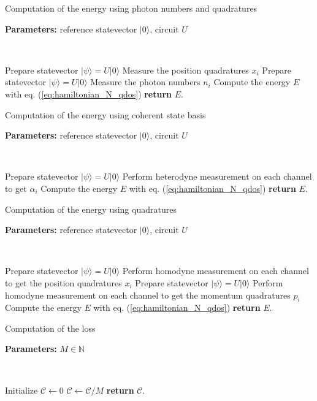 \documentclass[reprint, amsmath, amssymb, aps]{revtex4-2}
\begin{document}
    \begin{algorithm}
        \caption{Computation of the energy using photon numbers and quadratures}\label{alg:energy_computation}
            \textbf{Parameters:} reference statevector $|0\rangle$, circuit $U$

            \

            Prepare statevector $|\psi\rangle = U|0\rangle$\;
            Measure the position quadratures $x_i$\;
            Prepare statevector $|\psi\rangle = U|0\rangle$\;
            Measure the photon numbers $n_i$\;
            Compute the energy $E$ with eq. (\ref{eq:hamiltonian_N_qdos})\;
            \textbf{return} $E$.
    \end{algorithm}

    \begin{algorithm}
        \caption{Computation of the energy using coherent state basis}\label{alg:energy_computation_coherent_basis}
            \textbf{Parameters:} reference statevector $|0\rangle$, circuit $U$

            \

            Prepare statevector $|\psi\rangle = U|0\rangle$\;
            Perform heterodyne measurement on each channel to get $\alpha_i$\;
            Compute the energy $E$ with eq. (\ref{eq:hamiltonian_N_qdos})\;
            \textbf{return} $E$.
    \end{algorithm}

    \begin{algorithm}
        \caption{Computation of the energy using quadratures}
        \label{alg:energy_computation_quadratures}
            \textbf{Parameters:} reference statevector $|0\rangle$, circuit $U$

            \

            Prepare statevector $|\psi\rangle = U|0\rangle$\;
            Perform homodyne measurement on each channel to get the position quadratures $x_i$\;
            Prepare statevector $|\psi\rangle = U|0\rangle$\;
            Perform homodyne measurement on each channel to get the momentum quadratures $p_i$\;
            Compute the energy $E$ with eq. (\ref{eq:hamiltonian_N_qdos})\;
            \textbf{return} $E$.
    \end{algorithm}

    \begin{algorithm}
        \caption{Computation of the loss}\label{alg:loss_computation}
            \textbf{Parameters:} $M\in\mathbb N$

            \

            Initialize $\mathcal C \gets 0$\;
                $\mathcal C \gets \mathcal C / M$\;
            \textbf{return} $\mathcal C$.
    \end{algorithm}
\end{document}
